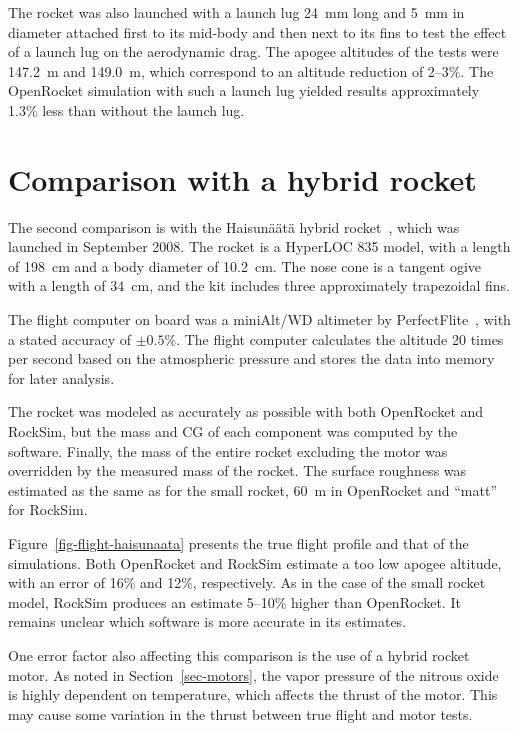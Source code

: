 The rocket was also launched with a launch lug 24~mm long and 5~mm in
diameter attached first to its mid-body and then next to its fins to
test the effect of a launch lug on the aerodynamic drag.  The apogee
altitudes of the tests were 147.2~m and 149.0~m, which correspond to
an altitude reduction of 2--3\%.  The OpenRocket simulation with such
a launch lug yielded results approximately 1.3\% less than without the
launch lug.




\section{Comparison with a hybrid rocket}
\label{sec-comparison-large}

The second comparison is with the Haisunäätä hybrid
rocket~\cite{haisunaata-launch}, which was launched in September 2008.
The rocket is a HyperLOC 835 model, with a length of 198~cm and a body
diameter of 10.2~cm.  The nose cone is a tangent ogive with a length
of 34~cm, and the kit includes three approximately trapezoidal fins.

The flight computer on board was a miniAlt/WD altimeter by
PerfectFlite~\cite{perfectflite}, with a stated accuracy of 
$\pm0.5\%$.  The flight computer calculates the altitude 20 times per
second based on the atmospheric pressure and stores the data into
memory for later analysis.

The rocket was modeled as accurately as possible with both OpenRocket
and RockSim, but the mass and CG of each component was computed by the
software.  Finally, the mass of the entire rocket excluding the motor
was overridden by the measured mass of the rocket.  The surface
roughness was estimated as the same as for the small rocket,
60~\textmu m in OpenRocket and ``matt'' for RockSim.

Figure~\ref{fig-flight-haisunaata} presents the true flight profile
and that of the simulations.  Both OpenRocket and RockSim estimate a
too low apogee altitude, with an error of 16\% and 12\%,
respectively.  As in the case of the small rocket model, RockSim
produces an estimate 5--10\% higher than OpenRocket.  It remains
unclear which software is more accurate in its estimates.



One error factor also affecting this comparison is the use of a hybrid
rocket motor.  As noted in Section~\ref{sec-motors}, the vapor
pressure of the nitrous oxide is highly dependent on temperature,
which affects the thrust of the motor.  This may cause some variation
in the thrust between true flight and motor tests.

